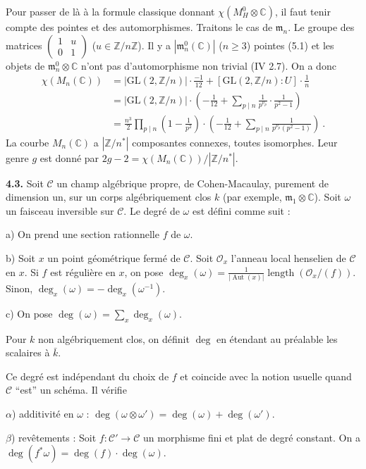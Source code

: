 \documentclass[10pt,a4paper]{amsart}
\theoremstyle{plain}
\theoremstyle{definition}
\DeclareMathOperator{\Aut}{Aut}
\renewcommand{\deg}{\operatorname{deg}}
\newcommand{\m}{\mathfrak{m}}
\newcommand{\cC}{\mathcal{C}}
\newcommand{\ZZ}{\mathbb{Z}}
\newcommand{\CC}{\mathbb{C}}
\newcommand{\GL}{\mathrm{GL}}
\DeclareMathOperator{\length}{length}
\begin{document}
Pour passer de l\`a \`a la formule classique donnant $\chi(M_H^0 \otimes \CC)$, il faut tenir compte des pointes et des automorphismes. Traitons le cas de $\m_n$. Le groupe des matrices $\begin{pmatrix} 1 & u \\ 0 & 1 \end{pmatrix}$ ($u \in \ZZ/n\ZZ$). Il y a $|\m_n^0(\CC)|$ ($n \geq 3$) pointes (5.1) et les objets de $\m_n^0 \otimes \CC$ n'ont pas d'automorphisme non trivial (IV 2.7). On a donc
\begin{align*}
\chi(M_n(\CC)) &= |\GL(2,\ZZ/n)| \cdot \frac{-1}{12} + [\GL(2,\ZZ/n) : U] \cdot \frac{1}{n}\\
&= |\GL(2,\ZZ/n)| \cdot \left(-\frac{1}{12} + \sum_{p \mid n} \frac{1}{p^{\nu_p}} \cdot \frac{1}{p^2 - 1}\right)\\
&= \frac{n^3}{2} \prod_{p \mid n} \left(1 - \frac{1}{p^2}\right) \cdot \left(-\frac{1}{12} + \sum_{p \mid n} \frac{1}{p^{\nu_p}(p^2 - 1)}\right)\ .
\end{align*}
La courbe $M_n(\CC)$ a $|\ZZ/n^*|$ composantes connexes, toutes isomorphes. Leur genre $g$ est donn\'e par $2g - 2 = \chi(M_n(\CC))/|\ZZ/n^*|$.

\medskip\noindent\textbf{4.3.} Soit $\cC$ un champ alg\'ebrique propre, de Cohen-Macaulay, purement de dimension un, sur un corps alg\'ebriquement clos $k$ (par exemple, $\m_1 \otimes \CC$). Soit $\omega$ un faisceau inversible sur $\cC$. Le degr\'e de $\omega$ est d\'efini comme suit :

a) On prend une section rationnelle $f$ de $\omega$.

b) Soit $x$ un point g\'eom\'etrique ferm\'e de $\cC$. Soit $\mathcal{O}_x$ l'anneau local henselien de $\cC$ en $x$. Si $f$ est r\'eguli\`ere en $x$, on pose $\deg_x(\omega) = \frac{1}{|\Aut(x)|} \length(\mathcal{O}_x/(f))$. Sinon, $\deg_x(\omega) = -\deg_x(\omega^{-1})$.

c) On pose $\deg(\omega) = \sum_x \deg_x(\omega)$.

Pour $k$ non alg\'ebriquement clos, on d\'efinit $\deg$ en \'etendant au pr\'ealable les scalaires \`a $\bar{k}$.

Ce degr\'e est ind\'ependant du choix de $f$ et co\:incide avec la notion usuelle quand $\cC$ ``est'' un sch\'ema. Il v\'erifie

$\alpha$) additivit\'e en $\omega$ : $\deg(\omega \otimes \omega') = \deg(\omega) + \deg(\omega')$.

$\beta$) rev\^etements : Soit $f : \cC' \to \cC$ un morphisme fini et plat de degr\'e constant. On a $\deg(f^*\omega) = \deg(f) \cdot \deg(\omega)$.
\end{document}
